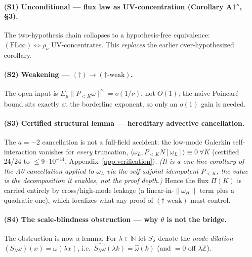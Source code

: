 \documentclass[11pt]{article}
\theoremstyle{remark}
\theoremstyle{plain}
\begin{document}
\paragraph{(S1) Unconditional --- flux law as UV-concentration (Corollary A1$''$, \S3).} The
two-hypothesis chain collapses to a hypothesis-free equivalence: $(\mathrm{FL}\infty) \iff \rho_\nu$
UV-concentrates. This \emph{replaces} the earlier over-hypothesized corollary.

\paragraph{(S2) Weakening --- $(\dagger) \to (\dagger\text{-weak})$.} The open input is $E_\mu\|P_{<K}\omega\|^2 = o(1/\nu)$,
not $O(1)$; the naive Poincar\'e bound sits exactly at the borderline exponent, so
only an $o(1)$ gain is needed.

\paragraph{(S3) Certified structural lemma --- hereditary advective cancellation.} The $a=-2$
cancellation is not a full-field accident: the low-mode Galerkin self-interaction
vanishes for \emph{every} truncation, $\langle \omega_L, P_{<K}N[\omega_L]\rangle \equiv 0\ \forall K$
(certified 24/24 to $\le 9\cdot10^{-14}$, Appendix~\ref{app:verification}). \emph{(It is a one-line
corollary of the A0 cancellation applied to $\omega_L$ via the self-adjoint idempotent
$P_{<K}$; the value is the decomposition it enables, not the proof depth.)} Hence
the flux $\Pi(K)$ is carried entirely by cross/high-mode leakage (a linear-in-$\|\omega_H\|$
term plus a quadratic one), which localizes what any proof of $(\dagger\text{-weak})$ must
control.

\paragraph{(S4) The scale-blindness obstruction --- why $\theta$ is not the bridge.}
The obstruction is now a lemma. For $\lambda \in \mathbb{N}$ let $S_\lambda$ denote the
\emph{mode dilation} $(S_\lambda\omega)(x) = \omega(\lambda x)$, i.e.\
$\widehat{S_\lambda\omega}(\lambda k) = \hat\omega(k)$ (and $=0$ off $\lambda\mathbb{Z}$).
\end{document}
